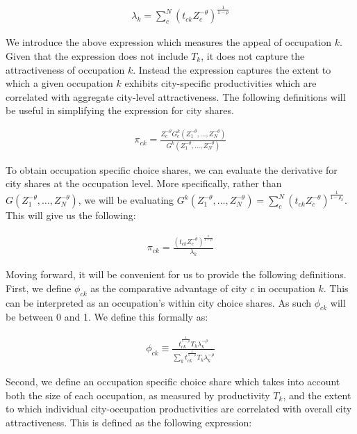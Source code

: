 \documentclass[10pt]{article}
\begin{document}
\begin{align*}
    \lambda_{k} = \sum_{c}^{N} \left( t_{ck} Z_{c}^{-\theta} \right)^{\frac{1}{1-\rho}}
\end{align*}

We introduce the above expression which measures the appeal of occupation $k$. Given that the expression does not include $T_k$, it does not capture the attractiveness of occupation $k$. Instead the expression captures the extent to which a given occupation $k$ exhibits city-specific productivities which are correlated with aggregate city-level attractiveness. The following definitions will be useful in simplifying the expression for city shares.

\begin{align*}
    \pi_{ck} = \frac{Z_c^{- \theta} G_c^k(Z_1^{- \theta}, \dots, Z_N^{- \theta})}{G^k(Z_1^{- \theta}, \dots, Z_N^{- \theta})}
\end{align*}

To obtain occupation specific choice shares, we can evaluate the derivative for city shares at the occupation level. More specifically, rather than $G(Z_1^{- \theta}, \dots, Z_N^{- \theta})$, we will be evaluating $G^k(Z_1^{- \theta}, \dots, Z_N^{- \theta}) = \sum_{c}^{N} (t_{ck} Z_c^{- \theta})^{\frac{1}{1 - \rho_k}}$. This will give us the following:

\begin{align}
    \pi_{ck} = \frac{(t_{ck} Z_c^{-\theta})^{\frac{1}{1 - \rho}}}{\lambda_k}
    \label{city_occuaption_shares}
\end{align}

Moving forward, it will be convenient for us to provide the following definitions. First, we define $\phi_{ck}$ as the comparative advantage of city $c$ in occupation $k$. This can be interpreted as an occupation's within city choice shares. As such $\phi_{ck}$ will be between 0 and 1. We define this formally as:

\begin{align}
    \phi_{ck} \equiv \frac{{t^{\frac{1}{1-\rho}}_{ck}}{T_{k}}\lambda_{k}^{-\rho}}{\sum\limits_{k}{t^{\frac{1}{1-\rho}}_{ck}}{T_{k}}\lambda_{k}^{-\rho}}
    \label{occupation_by_city_shares}
\end{align}

Second, we define an occupation specific choice share which takes into account both the size of each occupation, as measured by productivity $T_k$, and the extent to which individual city-occupation productivities are correlated with overall city attractiveness. This is defined as the following expression:
\end{document}
